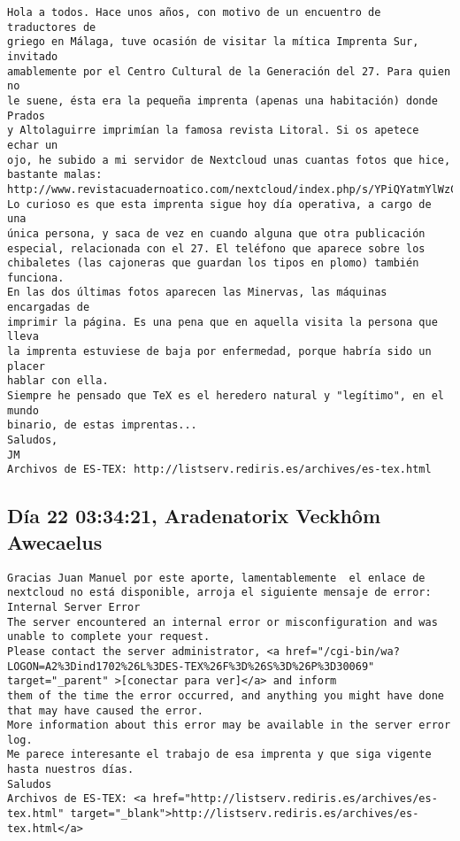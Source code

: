 \documentclass[a4paper,10pt]{article}
\begin{document}
\begin{lstlisting}
Hola a todos. Hace unos años, con motivo de un encuentro de traductores de
griego en Málaga, tuve ocasión de visitar la mítica Imprenta Sur, invitado
amablemente por el Centro Cultural de la Generación del 27. Para quien no
le suene, ésta era la pequeña imprenta (apenas una habitación) donde Prados
y Altolaguirre imprimían la famosa revista Litoral. Si os apetece echar un
ojo, he subido a mi servidor de Nextcloud unas cuantas fotos que hice,
bastante malas:
http://www.revistacuadernoatico.com/nextcloud/index.php/s/YPiQYatmYlWzCcx
Lo curioso es que esta imprenta sigue hoy día operativa, a cargo de una
única persona, y saca de vez en cuando alguna que otra publicación
especial, relacionada con el 27. El teléfono que aparece sobre los
chibaletes (las cajoneras que guardan los tipos en plomo) también funciona.
En las dos últimas fotos aparecen las Minervas, las máquinas encargadas de
imprimir la página. Es una pena que en aquella visita la persona que lleva
la imprenta estuviese de baja por enfermedad, porque habría sido un placer
hablar con ella.
Siempre he pensado que TeX es el heredero natural y "legítimo", en el mundo
binario, de estas imprentas...
Saludos,
JM
Archivos de ES-TEX: http://listserv.rediris.es/archives/es-tex.html

\end{lstlisting}

\subsection{Día 22 03:34:21, Aradenatorix Veckhôm Awecaelus}

\begin{lstlisting}
Gracias Juan Manuel por este aporte, lamentablemente  el enlace de
nextcloud no está disponible, arroja el siguiente mensaje de error:
Internal Server Error
The server encountered an internal error or misconfiguration and was
unable to complete your request.
Please contact the server administrator, <a href="/cgi-bin/wa?LOGON=A2%3Dind1702%26L%3DES-TEX%26F%3D%26S%3D%26P%3D30069" target="_parent" >[conectar para ver]</a> and inform
them of the time the error occurred, and anything you might have done
that may have caused the error.
More information about this error may be available in the server error log.
Me parece interesante el trabajo de esa imprenta y que siga vigente
hasta nuestros días.
Saludos
Archivos de ES-TEX: <a href="http://listserv.rediris.es/archives/es-tex.html" target="_blank">http://listserv.rediris.es/archives/es-tex.html</a>

\end{lstlisting}
\end{document}
